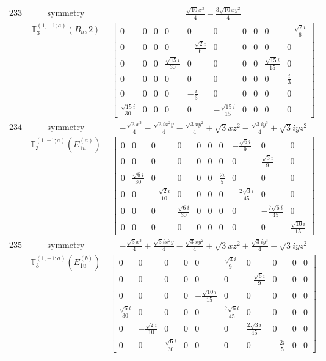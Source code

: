 \documentclass[fleqn,8pt,landscape]{jsarticle}
\begin{document}
\begin{longtable}{ccc}
$ 233 $ & $ \text{symmetry} $ & $ \frac{\sqrt{10} x^{3}}{4} - \frac{3 \sqrt{10} x y^{2}}{4} $ \\
$  $ & $ \mathbb{T}_{3}^{(1,-1;a)}(B_{u},2) $ & $ \begin{bmatrix} 0 & 0 & 0 & 0 & 0 & 0 & 0 & 0 & 0 & - \frac{\sqrt{2} i}{6} \\ 0 & 0 & 0 & 0 & - \frac{\sqrt{2} i}{6} & 0 & 0 & 0 & 0 & 0 \\ 0 & 0 & 0 & \frac{\sqrt{15} i}{30} & 0 & 0 & 0 & 0 & \frac{\sqrt{15} i}{15} & 0 \\ 0 & 0 & 0 & 0 & 0 & 0 & 0 & 0 & 0 & \frac{i}{3} \\ 0 & 0 & 0 & 0 & - \frac{i}{3} & 0 & 0 & 0 & 0 & 0 \\ \frac{\sqrt{15} i}{30} & 0 & 0 & 0 & 0 & - \frac{\sqrt{15} i}{15} & 0 & 0 & 0 & 0 \end{bmatrix} $ \\ \hline
$ 234 $ & $ \text{symmetry} $ & $ - \frac{\sqrt{3} x^{3}}{4} - \frac{\sqrt{3} i x^{2} y}{4} - \frac{\sqrt{3} x y^{2}}{4} + \sqrt{3} x z^{2} - \frac{\sqrt{3} i y^{3}}{4} + \sqrt{3} i y z^{2} $ \\
$  $ & $ \mathbb{T}_{3}^{(1,-1;a)}(E_{1u}^{(a)}) $ & $ \begin{bmatrix} 0 & 0 & 0 & 0 & 0 & 0 & 0 & - \frac{\sqrt{6} i}{9} & 0 & 0 \\ 0 & 0 & 0 & 0 & 0 & 0 & 0 & 0 & \frac{\sqrt{3} i}{9} & 0 \\ 0 & \frac{\sqrt{6} i}{30} & 0 & 0 & 0 & 0 & \frac{2 i}{5} & 0 & 0 & 0 \\ 0 & 0 & - \frac{\sqrt{2} i}{10} & 0 & 0 & 0 & 0 & - \frac{2 \sqrt{3} i}{45} & 0 & 0 \\ 0 & 0 & 0 & \frac{\sqrt{6} i}{30} & 0 & 0 & 0 & 0 & - \frac{7 \sqrt{6} i}{45} & 0 \\ 0 & 0 & 0 & 0 & 0 & 0 & 0 & 0 & 0 & \frac{\sqrt{10} i}{15} \end{bmatrix} $ \\ \hline
$ 235 $ & $ \text{symmetry} $ & $ - \frac{\sqrt{3} x^{3}}{4} + \frac{\sqrt{3} i x^{2} y}{4} - \frac{\sqrt{3} x y^{2}}{4} + \sqrt{3} x z^{2} + \frac{\sqrt{3} i y^{3}}{4} - \sqrt{3} i y z^{2} $ \\
$  $ & $ \mathbb{T}_{3}^{(1,-1;a)}(E_{1u}^{(b)}) $ & $ \begin{bmatrix} 0 & 0 & 0 & 0 & 0 & \frac{\sqrt{3} i}{9} & 0 & 0 & 0 & 0 \\ 0 & 0 & 0 & 0 & 0 & 0 & - \frac{\sqrt{6} i}{9} & 0 & 0 & 0 \\ 0 & 0 & 0 & 0 & - \frac{\sqrt{10} i}{15} & 0 & 0 & 0 & 0 & 0 \\ \frac{\sqrt{6} i}{30} & 0 & 0 & 0 & 0 & \frac{7 \sqrt{6} i}{45} & 0 & 0 & 0 & 0 \\ 0 & - \frac{\sqrt{2} i}{10} & 0 & 0 & 0 & 0 & \frac{2 \sqrt{3} i}{45} & 0 & 0 & 0 \\ 0 & 0 & \frac{\sqrt{6} i}{30} & 0 & 0 & 0 & 0 & - \frac{2 i}{5} & 0 & 0 \end{bmatrix} $ \\ \hline

\end{longtable}
\end{document}

